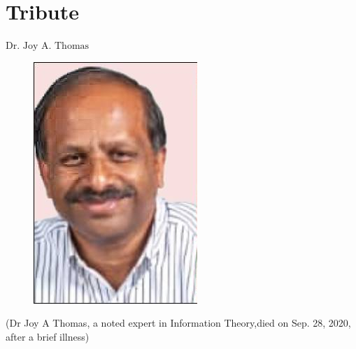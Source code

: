 \chapter{Tribute}




\vskip 0.8cm

\begin{center}
{\large\uppercase{$\text{Dr. Joy A. Thomas}$}} 


\vskip -6pt

\end{center}

\vskip 2cm




\vfill




\newpage



\begin{figure}[H]
\centering
\includegraphics[scale=2]{src/Figures/fig01.jpg}
\end{figure}

\begin{center}
(Dr Joy A Thomas, a noted expert in Information Theory,\break died on Sep. 28, 2020, after a brief illness)
\end{center}

